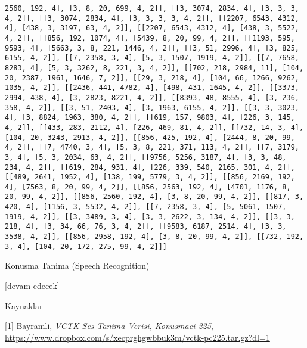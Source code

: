 \documentclass[12pt,fleqn]{article}\usepackage{../../common}
\begin{document}
\begin{verbatim}
2560, 192, 4], [3, 8, 20, 699, 4, 2]], [[3, 3074, 2834, 4], [3, 3, 3, 4, 2]], [[3, 3074, 2834, 4], [3, 3, 3, 3, 4, 2]], [[2207, 6543, 4312, 4], [438, 3, 3197, 63, 4, 2]], [[2207, 6543, 4312, 4], [438, 3, 5522, 4, 2]], [[856, 192, 1074, 4], [5439, 8, 20, 99, 4, 2]], [[1193, 595, 9593, 4], [5663, 3, 8, 221, 1446, 4, 2]], [[3, 51, 2996, 4], [3, 825, 6155, 4, 2]], [[7, 2358, 3, 4], [5, 3, 1507, 1919, 4, 2]], [[7, 7658, 8283, 4], [5, 3, 3262, 8, 221, 3, 4, 2]], [[702, 218, 2984, 11], [104, 20, 2387, 1961, 1646, 7, 2]], [[29, 3, 218, 4], [104, 66, 1266, 9262, 1035, 4, 2]], [[2436, 441, 4782, 4], [498, 431, 1645, 4, 2]], [[3373, 2994, 438, 4], [3, 2823, 8221, 4, 2]], [[8393, 48, 8555, 4], [3, 236, 358, 4, 2]], [[3, 51, 2403, 4], [3, 1963, 6155, 4, 2]], [[3, 3, 3023, 4], [3, 8824, 1963, 380, 4, 2]], [[619, 157, 9803, 4], [226, 3, 145, 4, 2]], [[433, 283, 2112, 4], [226, 469, 81, 4, 2]], [[732, 14, 3, 4], [104, 20, 3243, 2913, 4, 2]], [[856, 425, 192, 4], [2444, 8, 20, 99, 4, 2]], [[7, 4740, 3, 4], [5, 3, 8, 221, 371, 113, 4, 2]], [[7, 3179, 3, 4], [5, 3, 2034, 63, 4, 2]], [[9756, 5256, 3187, 4], [3, 3, 48, 234, 4, 2]], [[619, 284, 931, 4], [226, 339, 540, 2165, 301, 4, 2]], [[489, 2641, 1952, 4], [138, 199, 5779, 3, 4, 2]], [[856, 2169, 192, 4], [7563, 8, 20, 99, 4, 2]], [[856, 2563, 192, 4], [4701, 1176, 8, 20, 99, 4, 2]], [[856, 2560, 192, 4], [3, 8, 20, 99, 4, 2]], [[817, 3, 420, 4], [1156, 3, 5532, 4, 2]], [[7, 2358, 3, 4], [5, 5061, 1507, 1919, 4, 2]], [[3, 3489, 3, 4], [3, 3, 2622, 3, 134, 4, 2]], [[3, 3, 218, 4], [3, 34, 66, 76, 3, 4, 2]], [[9583, 6187, 2514, 4], [3, 3, 3538, 4, 2]], [[856, 2958, 192, 4], [3, 8, 20, 99, 4, 2]], [[732, 192, 3, 4], [104, 20, 172, 275, 99, 4, 2]]]
\end{verbatim}














Konusma Tanima (Speech Recognition)












[devam edecek]

Kaynaklar

[1] Bayramli, {\em VCTK Ses Tanima Verisi, Konusmaci 225}, \url{https://www.dropbox.com/s/xecprghgwbbuk3m/vctk-pc225.tar.gz?dl=1}
\end{document}
